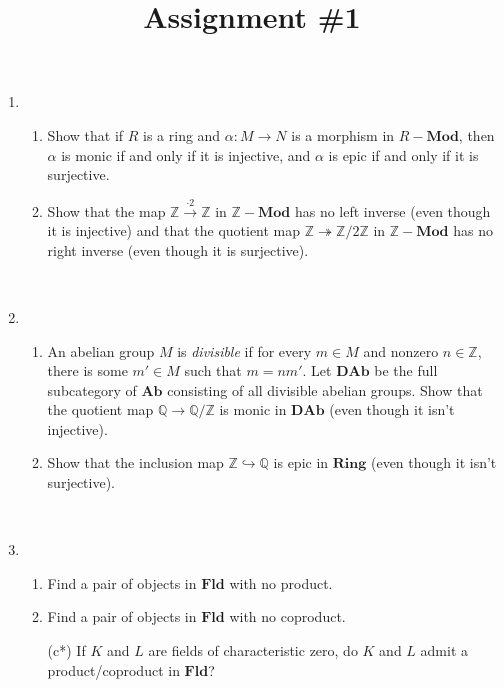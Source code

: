 \documentclass{amsart}[12pt]
\title{Assignment \#1}
\newcommand{\Q}{\mathbb{Q}}
\newcommand{\Z}{\mathbb{Z}}
\numberwithin{equation}{section}
\theoremstyle{plain} %
\theoremstyle{definition}
\theoremstyle{remark}
\newcommand{\xra}[1]{\xrightarrow{#1}}
\newcommand{\Ab}{\mathbf{Ab}}
\newcommand{\Ring}{\mathbf{Ring}}
\newcommand{\Fld}{\mathbf{Fld}}
\newcommand{\Mod}[1]{#1-\mathbf{Mod}}
\begin{document}
\onehalfspacing

\maketitle




\begin{enumerate}
\item 
\begin{enumerate}
\item Show that if $R$ is a ring and $\alpha:M\to N$ is a morphism in $\Mod{R}$, then $\alpha$ is monic if and only if it is injective, and $\alpha$ is epic if and only if it is surjective.%
\item Show that the map $\Z \xra{\cdot 2} \Z$ in $\Mod{\Z}$ has no left inverse (even though it is injective) and that the quotient map $\Z \twoheadrightarrow \Z/2\Z$ in $\Mod{\Z}$ has no right inverse (even though it is surjective).
\end{enumerate}

\


\item
\begin{enumerate}
\item An abelian group $M$ is \emph{divisible} if for every $m\in M$ and nonzero $n\in \Z$, there is some $m'\in M$ such that $m=n m'$. Let $\mathbf{DAb}$ be the full subcategory of $\Ab$ consisting of all divisible abelian groups. Show that the quotient map $\Q \to \Q/\Z$ is monic in $\mathbf{DAb}$ (even though it isn't injective).
\item Show that the inclusion map $\Z \hookrightarrow \Q$ is epic in $\Ring$ (even though it isn't surjective).
\end{enumerate}

\




\item \begin{enumerate}
\item Find a pair of objects in $\Fld$ with no product.
\item Find a pair of objects in $\Fld$ with no coproduct.
\item[(c*)] If $K$ and $L$ are fields of characteristic zero, do $K$ and $L$ admit a product/coproduct in $\Fld$?
\end{enumerate}



\end{enumerate}
\end{document}
